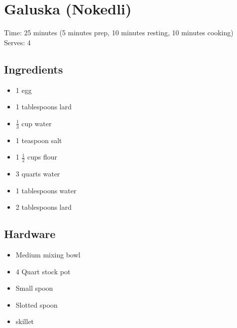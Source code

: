 \section{Galuska (Nokedli)}
\label{galuska}
\setcounter{secnumdepth}{0}
Time: 25 minutes (5 minutes prep, 10 minutes resting, 10 minutes cooking)
Serves: 4

\begin{multicols}{2}
\subsection*{Ingredients}
\begin{itemize}
    \item 1 egg
    \item 1 tablespoons lard
    \item \( \frac{1}{3} \) cup water
    \item 1 teaspoon salt
    \item 1 \( \frac{1}{2} \) cups flour
    \item 3 quarts water
    \item 1 tablespoons water
    \item 2 tablespoons lard
\end{itemize}

\subsection*{Hardware}
\begin{itemize}
    \item Medium mixing bowl
    \item 4 Quart stock pot
    \item Small spoon
    \item Slotted spoon
    \item skillet
\end{itemize}
\clearpage


\end{multicols}

